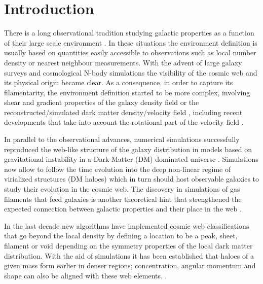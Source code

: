\documentclass[useAMS,usenatbib]{mn2e}
\begin{document}
\section{Introduction}
\label{sec:introduction}

There is a long observational tradition studying galactic properties
as a function of their large scale environment
\citep[e.g.][]{Oemler1974,Dressler1980,Pimbblet2002,Gomez2003,Kauffmann2004,Abbas2006,Baldry2006,Park2007,OMill2008,Gonzalez2009,Padilla2010,Wilman2010,Muldrew2012}. In these situations the environment definition is usually based on
quantities easily accessible to observations such as local number
density or nearest neighbour measurements. With
the advent of large galaxy surveys and cosmological N-body simulations
the visibility of the cosmic web and its physical origin became
clear. As a consequence, in order to capture its filamentarity, the
environment definition started to be more complex, involving shear and gradient properties of the galaxy density field or the reconstructed/simulated dark
matter density/velocity field
\citep[e.g.][]{Lee2005,Basilakos2006,AragonCalvo2007,Hahn2007,Sousbie2008,Zhang2009,Tweb,MunozCuartas2011,Vweb,Trowland2013,Tempel2014},
including recent developments that take into account the rotational
part of the velocity field \citep[e.g.][]{Wang2013,LibeskindVorticity}.

In parallel to the observational advances, numerical simulations
successfully reproduced the web-like structure of the galaxy
distribution in models based on gravitational instability in a Dark
Matter (DM) dominated universe
\citep[e.g.][]{Bond1996,Colberg2005}. Simulations now allow to follow
the time evolution into the deep non-linear regime of virialized
structures (DM haloes) which in turn should host observable
galaxies to study their evolution in the cosmic web. The discovery in
simulations of gas filaments that feed galaxies is another theoretical
hint that strengthened the expected connection between galactic
properties and their place in the web \citep{Ocvirk2008,Dekel2009}.  

In the last decade new algorithms have implemented cosmic web
classifications that go beyond the local density by defining a
location to be a peak, sheet, filament or void depending on the
symmetry properties of the local dark matter distribution. With the
aid of simulations it has been established that haloes of a given mass
form earlier in denser regions; concentration, angular momentum and
shape can also be aligned with these web
elements. \citep[e.g][]{AragonCalvo2007,Hahn2007,Zhang2009,Gonzalez2010,Noh2011,Codis2012,Libeskind2013,Trowland2013}.     
\end{document}
